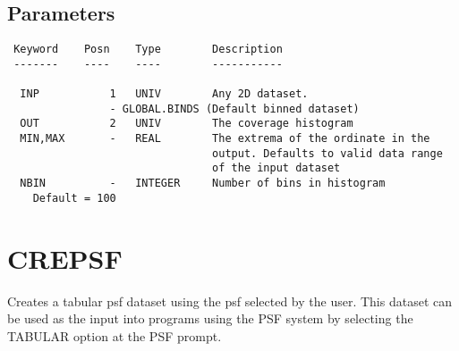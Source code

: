 \documentclass{book}
\renewcommand{\_}{{\tt\char'137}}     %
\begin{document}
\subsection{Parameters}
\begin{verbatim}
 Keyword    Posn    Type        Description
 -------    ----    ----        -----------

  INP           1   UNIV        Any 2D dataset.
                - GLOBAL.BINDS (Default binned dataset)
  OUT           2   UNIV        The coverage histogram
  MIN,MAX       -   REAL        The extrema of the ordinate in the
                                output. Defaults to valid data range
                                of the input dataset
  NBIN          -   INTEGER     Number of bins in histogram
    Default = 100

\end{verbatim}\section{CREPSF}
Creates a tabular psf dataset using the psf selected by the user.
This dataset can be used as the input into programs using the PSF
system by selecting the TABULAR option at the PSF prompt.
\end{document}
